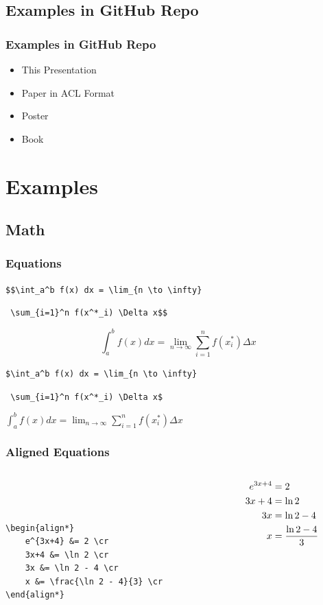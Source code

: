 \documentclass{beamer}
\begin{document}
\subsection{Examples in GitHub Repo}
\begin{frame}[t]
	\frametitle{Examples in GitHub Repo}
\Large

\begin{itemize}
	\item This Presentation
	\item Paper in ACL Format
	\item Poster
	\item Book
\end{itemize}

\end{frame}




\section{Examples}
\subsection{Math}
\begin{frame}[t, fragile]
	\frametitle{Equations}
\Large

\verb|$$\int_a^b f(x) dx = \lim_{n \to \infty}|

\qquad \verb| \sum_{i=1}^n f(x^*_i) \Delta x$$|

$$\int_a^b f(x) dx = \lim_{n \to \infty} \sum_{i=1}^n f(x^*_i) \Delta x$$

\verb|$\int_a^b f(x) dx = \lim_{n \to \infty}|

\qquad \verb| \sum_{i=1}^n f(x^*_i) \Delta x$|

\begin{center}
$\int_a^b f(x) dx = \lim_{n \to \infty} \sum_{i=1}^n f(x^*_i) \Delta x$
\end{center}
\end{frame}

\begin{frame}[t, fragile]
	\frametitle{Aligned Equations}
\Large

\begin{columns}[T]
\begin{column}{2in}
\begin{verbatim}



\begin{align*}
    e^{3x+4} &= 2 \cr
    3x+4 &= \ln 2 \cr
    3x &= \ln 2 - 4 \cr
    x &= \frac{\ln 2 - 4}{3} \cr
\end{align*}
\end{verbatim}
\end{column}
\begin{column}{2in}
\begin{align*}
	e^{3x+4} &= 2 \cr
	3x+4 &= \ln 2 \cr
	3x &= \ln 2 - 4 \cr
	x &= \frac{\ln 2 - 4}{3} \cr
\end{align*}
\end{column}
\end{columns}
\end{frame}
\end{document}
